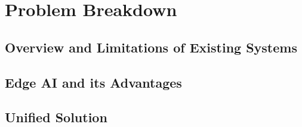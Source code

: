 \chapter{Problem Breakdown}
\label{chapter:problem-breakdown}



\section{Overview and Limitations of Existing Systems}
\label{sec:overview-and-limitations-of-existing-systems}


\section{Edge AI and its Advantages}
\label{sec:edge-ai-and-its-advantages}


\section{Unified Solution}
\label{sec:proposed-unified-solution}